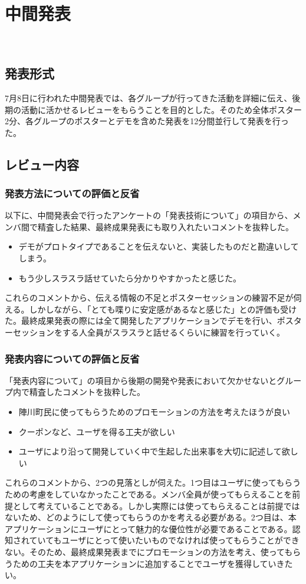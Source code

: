 \chapter{中間発表}
​
\section{発表形式}
7月8日に行われた中間発表では、各グループが行ってきた活動を詳細に伝え、後期の活動に活かせるレビューをもらうことを目的とした。そのため全体ポスター2分、各グループのポスターとデモを含めた発表を12分間並行して発表を行った。

\section{レビュー内容}%
\subsection{発表方法についての評価と反省}%
以下に、中間発表会で行ったアンケートの「発表技術について」の項目から、メンバ間で精査した結果、最終成果発表にも取り入れたいコメントを抜粋した。
\begin{itemize}
  \item デモがプロトタイプであることを伝えないと、実装したものだと勘違いしてしまう。
  \item もう少しスラスラ話せていたら分かりやすかったと感じた。
\end{itemize}
    これらのコメントから、伝える情報の不足とポスターセッションの練習不足が伺える。しかしながら、「とても喋りに安定感があるなと感じた」との評価も受けた。最終成果発表の際には全て開発したアプリケーションでデモを行い、ポスターセッションをする人全員がスラスラと話せるくらいに練習を行っていく。

\subsection{発表内容についての評価と反省}
    「発表内容について」の項目から後期の開発や発表において欠かせないとグループ内で精査したコメントを抜粋した。
\begin{itemize}
  \item 陣川町民に使ってもらうためのプロモーションの方法を考えたほうが良い
  \item クーポンなど、ユーザを得る工夫が欲しい
  \item ユーザにより沿って開発していく中で生起した出来事を大切に記述して欲しい
\end{itemize}
    これらのコメントから、2つの見落としが伺えた。1つ目はユーザに使ってもらうための考慮をしていなかったことである。メンバ全員が使ってもらえることを前提として考えていることである。しかし実際には使ってもらえることは前提ではないため、どのようにして使ってもらうのかを考える必要がある。2つ目は、本アプリケーションにユーザにとって魅力的な優位性が必要であることである。認知されていてもユーザにとって使いたいものでなければ使ってもらうことができない。そのため、最終成果発表までにプロモーションの方法を考え、使ってもらうための工夫を本アプリケーションに追加することでユーザを獲得していきたい。
